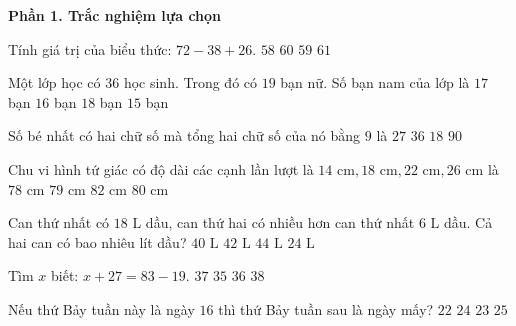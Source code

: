 \textbf{Phần 1. Trắc nghiệm lựa chọn}

\begin{ex} %
Tính giá trị của biểu thức: $72 - 38 + 26$.
\choice
{$58$}
{\True $60$}
{$59$}
{$61$}
\end{ex}

\begin{ex} %
Một lớp học có $36$ học sinh. Trong đó có $19$ bạn nữ. Số bạn nam của lớp là
\choice
{\True $17$ bạn}
{$16$ bạn}
{$18$ bạn}
{$15$ bạn}
\end{ex}

\begin{ex} %
Số bé nhất có hai chữ số mà tổng hai chữ số của nó bằng $9$ là
\choice
{$27$}
{$36$}
{\True $18$}
{$90$}
\end{ex}

\begin{ex} %
Chu vi hình tứ giác có độ dài các cạnh lần lượt là $14\text{ cm}, 18\text{ cm}, 22\text{ cm}, 26\text{ cm}$ là
\choice
{$78\text{ cm}$}
{$79\text{ cm}$}
{$82\text{ cm}$}
{\True $80\text{ cm}$}
\end{ex}

\begin{ex} %
Can thứ nhất có $18\text{ L}$ dầu, can thứ hai có nhiều hơn can thứ nhất $6\text{ L}$ dầu. Cả hai can có bao nhiêu lít dầu?
\choice
{$40\text{ L}$}
{\True $42\text{ L}$}
{$44\text{ L}$}
{$24\text{ L}$}
\end{ex}

\begin{ex} %
Tìm $x$ biết: $x + 27 = 83 - 19$.
\choice
{\True $37$}
{$35$}
{$36$}
{$38$}
\end{ex}

\begin{ex} %
Nếu thứ Bảy tuần này là ngày $16$ thì thứ Bảy tuần sau là ngày mấy?
\choice
{$22$}
{$24$}
{\True $23$}
{$25$}
\end{ex}

